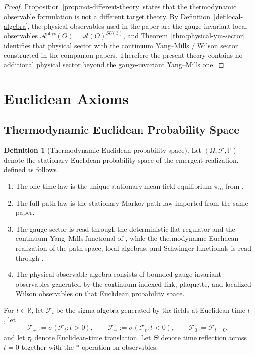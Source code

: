 \documentclass[11pt]{article}
\theoremstyle{definition}
\newtheorem{definition}[theorem]{Definition}
\theoremstyle{remark}
\newcommand{\R}{\mathbb R}
\newcommand{\mcA}{\mathcal A}
\begin{document}
\begin{proof}
Proposition~\ref{prop:not-different-theory} states that the thermodynamic
observable formulation is not a different target theory.  By
Definition~\ref{def:local-algebra}, the physical observables used in the
paper are the gauge-invariant local observables
\(\mcA^{\mathrm{phys}}(O)=\mcA(O)^{SU(3)}\), and Theorem~\ref{thm:physical-ym-sector}
identifies that physical sector with the continuum Yang--Mills / Wilson sector
constructed in the companion papers.  Therefore the present theory contains no
additional physical sector beyond the gauge-invariant Yang--Mills one.
\end{proof}

\section{Euclidean Axioms}
\label{sec:os}

\subsection{Thermodynamic Euclidean Probability Space}

\begin{definition}[Thermodynamic Euclidean probability space]
\label{def:thermo-euclidean-space}
Let $(\Omega,\mathcal F,\mathbb P)$ denote the stationary Euclidean probability
space of the emergent realization, defined as follows.
\begin{enumerate}[label=\textnormal{(\roman*)},leftmargin=1.5em]
\item The one-time law is the unique stationary mean-field equilibrium
$\pi_\infty$ from \cite{convergence}.
\item The full path law is the stationary Markov path law imported from the same
paper.
\item The gauge sector is read through the deterministic flat regulator and the
continuum Yang--Mills functional of \cite{lattice}, while the thermodynamic
Euclidean realization of the path space, local algebras, and Schwinger
functionals is read through \cite{quantization}.
\item The physical observable algebra consists of bounded gauge-invariant
observables generated by the continuum-indexed link, plaquette, and localized
Wilson observables on that Euclidean probability space.
\end{enumerate}
For $t\in\R$, let $\mathcal F_t$ be the sigma-algebra generated by the fields at
Euclidean time $t$, let
\[
\mathcal F_+:=\sigma(\mathcal F_t:t>0),\qquad
\mathcal F_-:=\sigma(\mathcal F_t:t<0),\qquad
\mathcal F_0:=\mathcal F_{t=0},
\]
and let $\tau_t$ denote Euclidean-time translation.  Let $\Theta$ denote time
reflection across $t=0$ together with the $*$-operation on observables.
\end{definition}
\end{document}
